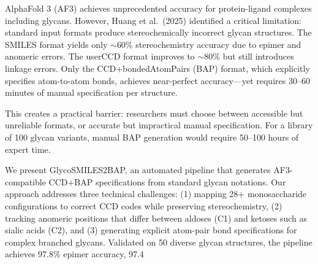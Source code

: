 \documentclass[11pt,a4paper]{article}
\begin{document}
AlphaFold 3 (AF3) achieves unprecedented accuracy for protein-ligand complexes including glycans. However, Huang et al.\ (2025) identified a critical limitation: standard input formats produce stereochemically incorrect glycan structures. The SMILES format yields only $\sim$60\% stereochemistry accuracy due to epimer and anomeric errors. The userCCD format improves to $\sim$80\% but still introduces linkage errors. Only the CCD+bondedAtomPairs (BAP) format, which explicitly specifies atom-to-atom bonds, achieves near-perfect accuracy---yet requires 30--60 minutes of manual specification per structure.

This creates a practical barrier: researchers must choose between accessible but unreliable formats, or accurate but impractical manual specification. For a library of 100 glycan variants, manual BAP generation would require 50--100 hours of expert time.

We present GlycoSMILES2BAP, an automated pipeline that generates AF3-compatible CCD+BAP specifications from standard glycan notations. Our approach addresses three technical challenges: (1) mapping 28+ monosaccharide configurations to correct CCD codes while preserving stereochemistry, (2) tracking anomeric positions that differ between aldoses (C1) and ketoses such as sialic acids (C2), and (3) generating explicit atom-pair bond specifications for complex branched glycans. Validated on 50 diverse glycan structures, the pipeline achieves 97.8\% epimer accuracy, 97.4\
\end{document}
